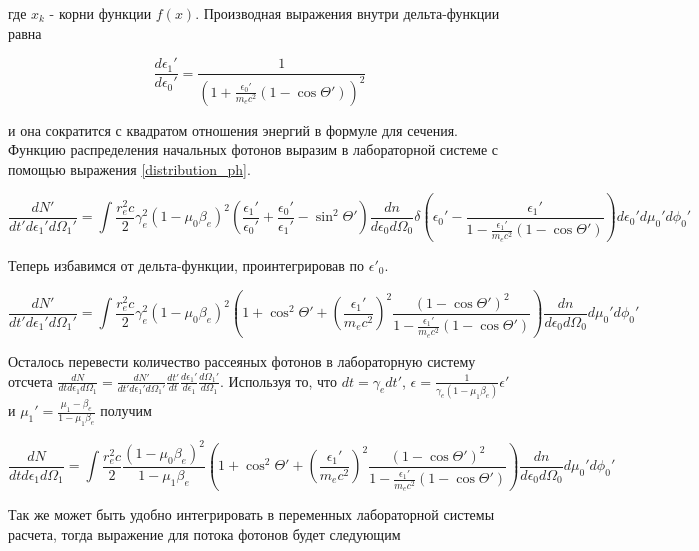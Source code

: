где $x_k$ - корни функции $f(x)$. Производная выражения внутри дельта-функции равна

\begin{equation}
	\frac{d\epsilon_1'}{d\epsilon_0'}=\frac{1}{(1+\frac{\epsilon_0'}{m_e c^2}(1 - \cos \Theta'))^2}
\end{equation}

и она сократится с квадратом отношения энергий в формуле для сечения. Функцию распределения начальных фотонов выразим в лабораторной системе с помощью выражения \ref{distribution_ph}.

\begin{equation}
\frac{dN'}{dt'd\epsilon_1'd\Omega_1'}=\int \frac{r_e^2 c}{2} \gamma_e^2 (1 - \mu_0 \beta_e)^2 \left(\frac{\epsilon_1'}{\epsilon_0'}+\frac{\epsilon_0'}{\epsilon_1'}-\sin^2\Theta'\right)\frac{dn}{d\epsilon_0 d\Omega_0} \delta\left(\epsilon_0' - \frac{\epsilon_1'}{1-\frac{\epsilon_1'}{m_e c^2}(1 - \cos \Theta')}\right) d\epsilon_0'd\mu_0' d\phi_0'
\end{equation}

Теперь избавимся от дельта-функции, проинтегрировав по $\epsilon'_0$.

\begin{equation}
\frac{dN'}{dt'd\epsilon_1'd\Omega_1'}=\int \frac{r_e^2 c}{2} \gamma_e^2 (1 - \mu_0 \beta_e)^2 \left(1 + \cos^2\Theta'+\left(\frac{\epsilon_1'}{m_e c^2}\right)^2\frac{(1-\cos\Theta')^2}{1-\frac{\epsilon_1'}{m_e c^2}(1 - \cos \Theta')}\right)\frac{dn}{d\epsilon_0 d\Omega_0}d\mu_0' d\phi_0'
\end{equation}

Осталось перевести количество рассеяных фотонов в лабораторную систему отсчета $\frac{dN}{dt d\epsilon_1 d\Omega_1} = \frac{dN'}{dt' d\epsilon_1' d\Omega_1'}\frac{dt'}{dt}\frac{d\epsilon_1'}{d\epsilon_1}\frac{d\Omega_1'}{d\Omega_1}$. Используя то, что $dt = \gamma_e dt'$, $\epsilon = \frac{1}{\gamma_e(1 -\mu_1\beta_e)}\epsilon'$ и $\mu_1' = \frac{\mu_1-\beta_e}{1-\mu_1 \beta_e}$ получим

\begin{equation} \label{compton_elframe}
\frac{dN}{dt d\epsilon_1 d\Omega_1}=\int \frac{r_e^2 c}{2} \frac{(1 - \mu_0 \beta_e)^2}{1-\mu_1\beta_e} \left(1 + \cos^2\Theta'+\left(\frac{\epsilon_1'}{m_e c^2}\right)^2\frac{(1-\cos\Theta')^2}{1-\frac{\epsilon_1'}{m_e c^2}(1 - \cos \Theta')}\right)\frac{dn}{d\epsilon_0 d\Omega_0}d\mu_0' d\phi_0'	
\end{equation}

Так же может быть удобно интегрировать в переменных лабораторной системы расчета, тогда выражение для потока фотонов будет следующим

